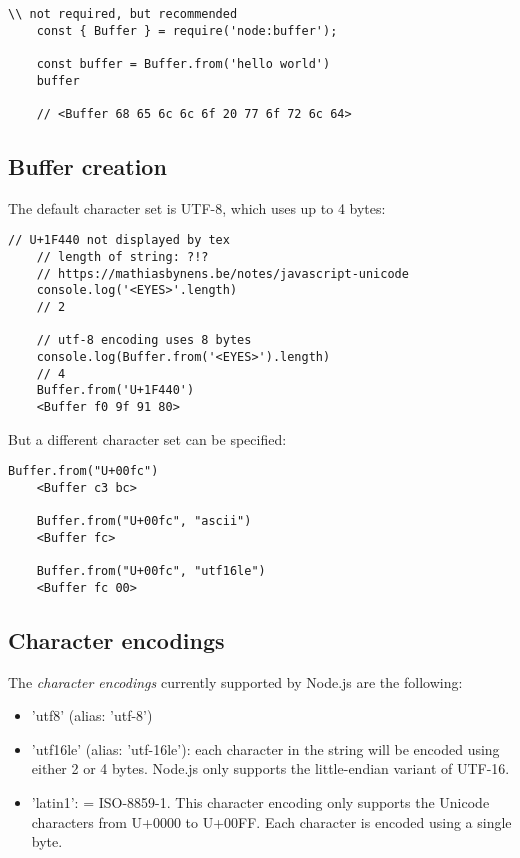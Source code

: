 \documentclass{scrartcl}
\begin{document}
\begin{lstlisting}[style=ES6]
    \\ not required, but recommended
    const { Buffer } = require('node:buffer');

    const buffer = Buffer.from('hello world')
    buffer

    // <Buffer 68 65 6c 6c 6f 20 77 6f 72 6c 64>

\end{lstlisting}

\subsection{Buffer creation}

The default character set is UTF-8, which uses up to 4 bytes:

\begin{lstlisting}[style=ES6]
    // U+1F440 not displayed by tex
    // length of string: ?!?
    // https://mathiasbynens.be/notes/javascript-unicode
    console.log('<EYES>'.length)
    // 2

    // utf-8 encoding uses 8 bytes
    console.log(Buffer.from('<EYES>').length)
    // 4
    Buffer.from('U+1F440')
    <Buffer f0 9f 91 80>
\end{lstlisting}

But a different character set can be specified:

\begin{lstlisting}[style=ES6]
    Buffer.from("U+00fc")
    <Buffer c3 bc>

    Buffer.from("U+00fc", "ascii")
    <Buffer fc>

    Buffer.from("U+00fc", "utf16le")
    <Buffer fc 00>

\end{lstlisting}

\subsection{Character encodings}

The\textit{ character encodings} currently supported by Node.js are the following:

\begin{itemize}
    \item 'utf8' (alias: 'utf-8')
    \item 'utf16le' (alias: 'utf-16le'): each character in the string will be encoded using either 2 or 4 bytes. Node.js only supports the little-endian variant of UTF-16.
    \item 'latin1': = ISO-8859-1. This character encoding only supports the Unicode characters from U+0000 to U+00FF. Each character is encoded using a single byte.
\end{itemize}
\end{document}
